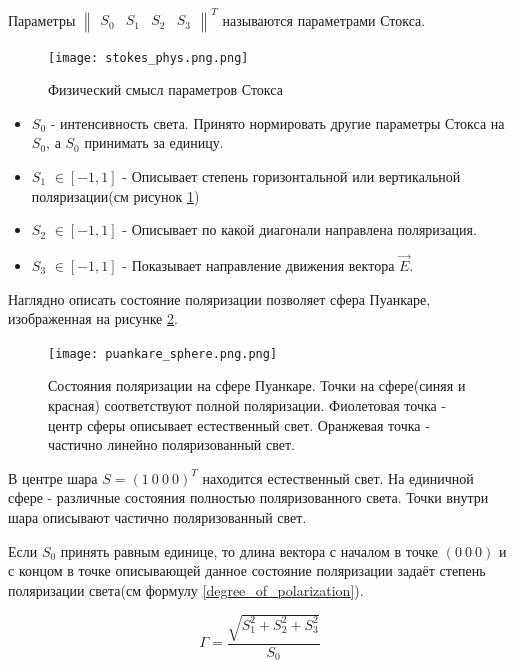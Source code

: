 \documentclass[a4paper]{article}
\begin{document}
Параметры $\begin{Vmatrix} S_{0} & S_{1} & S_{2} & S_3 \end{Vmatrix}^{T}$ называются параметрами Стокса.  


\begin{figure}[htbp]
  \centering
  \texttt{[image: stokes\_phys.png.png]}
  \caption{Физический смысл параметров Стокса}
  \label{fig:stokes_parametrs_examples}
\end{figure}


\begin{itemize}
    \item \textcolor{defenition}{$S_{0}$} - интенсивность света. Принято нормировать другие параметры Стокса на $S_{0}$, а $S_{0}$ принимать за единицу.
    \item \textcolor{defenition}{$S_{1}$} $\in [-1, 1]$ - Описывает степень горизонтальной или вертикальной поляризации(см рисунок \ref{fig:stokes_parametrs_examples})
    \item \textcolor{defenition}{$S_{2}$} $\in [-1, 1]$ -  Описывает по какой диагонали направлена поляризация. 
    \item \textcolor{defenition}{$S_{3}$} $\in [-1, 1]$ - Показывает направление движения вектора $\vec{E}$.
\end{itemize}



Наглядно описать состояние поляризации позволяет сфера Пуанкаре, изображенная на рисунке \ref{fig:puankare_sphere}.

\begin{figure}[htbp]
  \centering
  \texttt{[image: puankare\_sphere.png.png]}
  \caption{Состояния поляризации  на сфере Пуанкаре. Точки на сфере(синяя и красная) соответствуют полной поляризации. Фиолетовая точка - центр сферы описывает естественный свет. Оранжевая точка - частично линейно поляризованный свет.}
  \label{fig:puankare_sphere}
\end{figure}

В центре шара $S = (1 \ 0 \ 0 \ 0)^{T}$ находится естественный свет. На единичной сфере - различные состояния полностью поляризованного света. Точки внутри шара описывают частично поляризованный свет.  

Если $S_{0}$ принять равным единице, то длина вектора с началом в точке $(0 \ 0 \ 0)$ и с концом в точке описывающей данное состояние поляризации задаёт степень поляризации света(см формулу \ref{degree_of_polarization}).

\begin{equation}
    \boxed{
        \Gamma = \frac{\sqrt{S_{1}^{2} + S_{2}^{2} + S_{3}^{2}}}{S_{0}}
    }
    \label{degree_of_polarization}
\end{equation}
\end{document}
